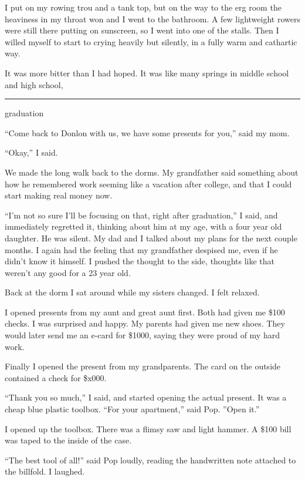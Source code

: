 I put on my rowing trou and a tank top, but on the way to the erg room the
heaviness in my throat won and I went to the bathroom.  A few lightweight
rowers were still there putting on sunscreen, so I went into one of the stalls.
Then I willed myself to start to crying heavily but silently, in a fully warm
and cathartic way.  

It was more bitter than I had hoped.  It was like many springs in middle school
and high school, 

\plainfancybreak{12pt}{2}{* * *}

graduation

``Come back to Donlon with us, we have some presents for you,'' said my mom. 

``Okay,'' I said.  

We made the long walk back to the dorms.  My grandfather said something about
how he remembered work seeming like a vacation after college, and that I could
start making real money now.

``I'm not so sure I'll be focusing on that, right after graduation,'' I said,
and immediately regretted it, thinking about him at my age, with a four year old
daughter.  He was silent.  My dad and I talked about my plans for the next
couple months.  I again had the feeling that my grandfather despised me, even if
he didn't know it himself.  I pushed the thought to the side, thoughts like that
weren't any good for a 23 year old.

Back at the dorm I sat around while my sisters changed.  I felt relaxed.

I opened presents from my aunt and great aunt first.  Both had given me \$100
checks.  I was surprised and happy.  My parents had given me new shoes.  They
would later send me an e-card for \$1000, saying they were proud of my hard
work.  

Finally I opened the present from my grandparents.  The card on the outside
contained a check for \$x000.  

``Thank you so much,'' I said, and started opening the actual present.  It was a
cheap blue plastic toolbox.  ``For your apartment,'' said Pop.  ''Open it.''

I opened up the toolbox.  There was a flimsy saw and light hammer.  A \$100 bill
was taped to the inside of the case.

``The best tool of all!'' said Pop loudly, reading the handwritten note attached
to the billfold.  I laughed.
